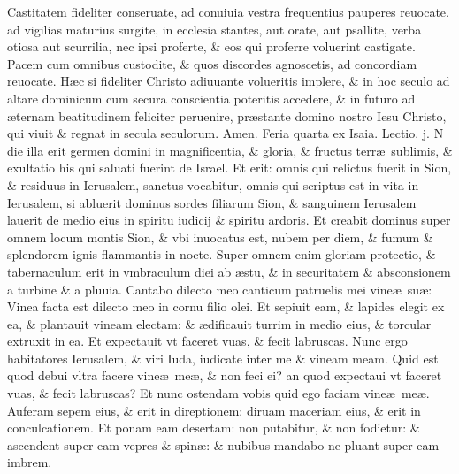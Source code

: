 \documentclass[a5paper,10pt]{book}
\def\leftmarginnote{%
	\lrmarginnote{\hskip -\marginparsep \hskip -6.5em}}
\def\ae{æ}
\begin{document}
\begin{multicols*}{2}
Castitatem fideliter conseruate, ad conuiuia vestra frequentius pauperes reuocate, ad vigilias maturius surgite, in ecclesia stantes, aut orate, aut psallite, verba otiosa aut scurrilia, nec ipsi proferte, \& eos qui proferre voluerint castigate.
Pacem cum omnibus custodite, \& quos discordes agnoscetis, ad concordiam reuocate.
H\ae c si fideliter Christo adiuuante volueritis implere, \& in hoc seculo ad altare dominicum cum secura conscientia poteritis accedere, \& in futuro ad \ae ternam beatitudinem feliciter peruenire, pr\ae stante domino nostro Iesu Christo, qui viuit \& regnat in secula seculorum. Amen.
\newline {} \color{red} \hypertarget{WED-PRIMA-ADV}{Feria quarta} ex Isaia. \hfill Lectio. j. \color{black}
\vspace{-.5em}
N\leftmarginnote{\begin{flushright}ca. 4.\end{flushright}} die illa erit germen domini in magnificentia, \& gloria, \& fructus terr\ae \ sublimis, \& exultatio his qui saluati fuerint de Israel.
Et erit: omnis qui relictus fuerit in Sion, \& residuus in Ierusalem, sanctus vocabitur, omnis qui scriptus est in vita in Ierusalem, si abluerit dominus sordes filiarum Sion, \& sanguinem Ierusalem lauerit de medio eius in spiritu iudicij \& spiritu ardoris.
Et creabit dominus super omnem locum montis Sion, \& vbi inuocatus est, nubem per diem, \& fumum \& splendorem ignis flammantis in nocte.
Super omnem enim gloriam protectio, \& tabernaculum erit in vmbraculum diei ab \ae stu, \& in securitatem \& absconsionem a turbine \& a pluuia.
\newline \indent Cantabo\leftmarginnote{\begin{flushright}ca. 5.\end{flushright}} dilecto meo canticum patruelis mei vine\ae \ su\ae : Vinea facta est dilecto meo in cornu filio olei.
Et sepiuit eam, \& lapides elegit ex ea, \& plantauit vineam electam: \& \ae dificauit turrim in medio eius, \& torcular extruxit in ea. Et expectauit vt faceret vuas, \& fecit labruscas.
Nunc ergo habitatores Ierusalem, \& viri Iuda, iudicate inter me \& vineam meam.
Quid est quod debui vltra facere vine\ae \ me\ae , \& non feci ei? an quod expectaui vt faceret vuas, \& fecit labruscas?
Et nunc ostendam vobis quid ego faciam vine\ae \ me\ae .
Auferam sepem eius, \& erit in direptionem: diruam maceriam eius, \& erit in conculcationem.
Et ponam eam desertam: non putabitur, \& non fodietur: \& ascendent super eam vepres \& spin\ae : \& nubibus mandabo ne pluant super eam imbrem.

\end{multicols*}
\end{document}
